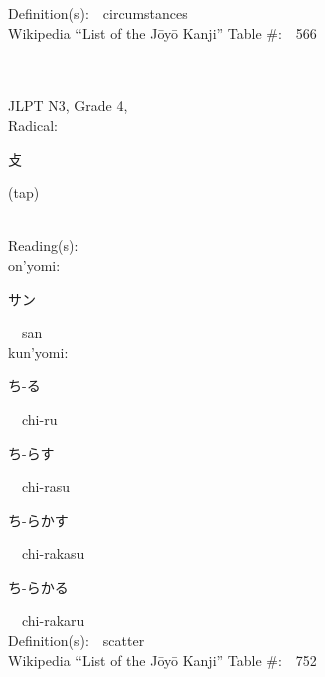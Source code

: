 \begin{multicols}{2}
Definition(s):\ \ circumstances \\
Wikipedia ``List of the J\=oy\=o Kanji'' Table \#:\ \ 566 \\
\ \ \\
{\fontsize{34pt}{40pt}  }\ \ \\  %
{JLPT N3, Grade 4, \\Radical:\ \ {\begin{CJK}{UTF8}{min} 攴 \end{CJK}} (tap) } \\
Reading(s):\ \ \\
{\hspace*{1em}}on'yomi:\ \ \\
{\hspace*{2em}}{\begin{CJK}{UTF8}{min} サン \end{CJK}}\ \ san\ \ \\
{\hspace*{1em}}kun'yomi:\ \ \\
{\hspace*{2em}}{\begin{CJK}{UTF8}{min} ち-る \end{CJK}}\ \ chi-ru\ \ \\
{\hspace*{2em}}{\begin{CJK}{UTF8}{min} ち-らす \end{CJK}}\ \ chi-rasu\ \ \\
{\hspace*{2em}}{\begin{CJK}{UTF8}{min} ち-らかす \end{CJK}}\ \ chi-rakasu\ \ \\
{\hspace*{2em}}{\begin{CJK}{UTF8}{min} ち-らかる \end{CJK}}\ \ chi-rakaru\ \ \\
Definition(s):\ \ scatter \\
Wikipedia ``List of the J\=oy\=o Kanji'' Table \#:\ \ 752 \\
\ \ \\
{\fontsize{34pt}{40pt}  }\ \ \\  %

\end{multicols}
